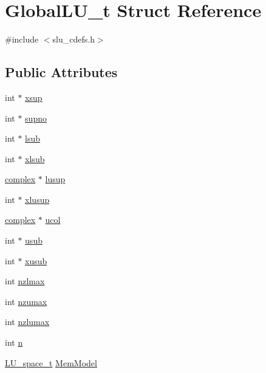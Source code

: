 \hypertarget{structGlobalLU__t}{}\section{Global\+L\+U\+\_\+t Struct Reference}
\label{structGlobalLU__t}


{\ttfamily \#include $<$slu\+\_\+cdefs.\+h$>$}

\subsection*{Public Attributes}
\begin{DoxyCompactItemize}
\item 
int $\ast$ \hyperlink{structGlobalLU__t_afbf1224e8b84fe4228a346e8a15a201f}{xsup}
\item 
int $\ast$ \hyperlink{structGlobalLU__t_ac575b30349d7f23a92a4662f2a10f7ff}{supno}
\item 
int $\ast$ \hyperlink{structGlobalLU__t_a826aa0459fee745ec40cd8d7c31ddcbd}{lsub}
\item 
int $\ast$ \hyperlink{structGlobalLU__t_a11adbaf38d57b4e811de9d124361f4d1}{xlsub}
\item 
\hyperlink{structcomplex}{complex} $\ast$ \hyperlink{structGlobalLU__t_acc7533550bb4c3479635a704ebfa9eb1}{lusup}
\item 
int $\ast$ \hyperlink{structGlobalLU__t_a12843837c9bb0679ca7f02d853667a85}{xlusup}
\item 
\hyperlink{structcomplex}{complex} $\ast$ \hyperlink{structGlobalLU__t_af9e46ab287726ab6be2c22cca773856d}{ucol}
\item 
int $\ast$ \hyperlink{structGlobalLU__t_a82284bf60f17d1e382e3a119f1cec460}{usub}
\item 
int $\ast$ \hyperlink{structGlobalLU__t_a062c5af94df0f66ab60439edd6516834}{xusub}
\item 
int \hyperlink{structGlobalLU__t_a1f77873222d31cd15eb781fdbf18df18}{nzlmax}
\item 
int \hyperlink{structGlobalLU__t_a5238cd65bea5ca45046238d908073982}{nzumax}
\item 
int \hyperlink{structGlobalLU__t_ae67b1da1b096e92b7ddadf6e4a159481}{nzlumax}
\item 
int \hyperlink{structGlobalLU__t_a48fcf5a7ff751514d92feeb40370fe5e}{n}
\item 
\hyperlink{superlu__enum__consts_8h_a494fe72ce954689dd95399ea9f1d87f6}{L\+U\+\_\+space\+\_\+t} \hyperlink{structGlobalLU__t_a9089591bf01db5135a9d52cb732b0f3c}{Mem\+Model}

\end{DoxyCompactItemize}
